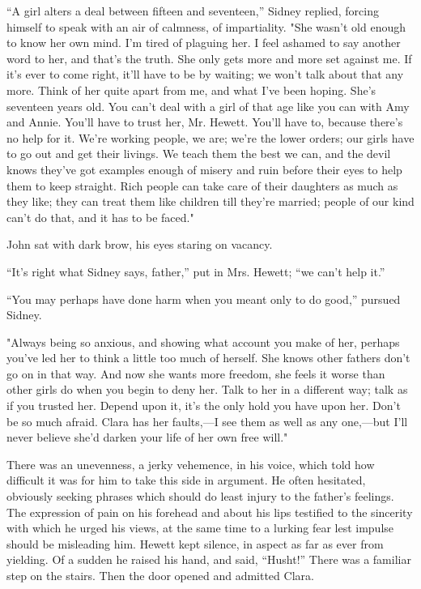 ``A girl alters a deal between fifteen and seventeen,'' Sidney replied,
forcing himself to speak with an air of calmness, of impartiality. "She
wasn't old enough to know her own mind. I'm tired of plaguing her. I
feel ashamed to say another word to her, and that's the truth. She only
gets more and more set against me. If it's ever to come right, it'll
have to be by waiting; we won't talk about that any more. Think of her
quite apart from me, and what I've been hoping. She's seventeen years
old. You can't deal with a girl of that age like you can with Amy and
Annie. You'll have to trust her, Mr. Hewett. You'll have to, because
there's no help for it. We're working people, we are; we're the lower
orders; our {}girls have to go out and get their livings. We teach them
the best we can, and the devil knows they've got examples enough of
misery and ruin before their eyes to help them to keep straight. Rich
people can take care of their daughters as much as they like; they can
treat them like children till they're married; people of our kind can't
do that, and it has to be faced."

John sat with dark brow, his eyes staring on vacancy.

``It's right what Sidney says, father,'' put in Mrs. Hewett; ``we can't
help it.''

``You may perhaps have done harm when you meant only to do good,''
pursued Sidney.

"Always being so anxious, and showing what account you make of her,
perhaps you've led her to think a little too much of herself. She knows
other fathers don't go on in that way. And now she wants more freedom,
she feels it worse than other girls do when you begin to deny her. Talk
to her in a different way; talk as if you trusted her. Depend upon it,
it's the only hold you have upon her. Don't {}be so much afraid. Clara
has her faults,---I see them as well as any one,---but I'll never
believe she'd darken your life of her own free will."

There was an unevenness, a jerky vehemence, in his voice, which told how
difficult it was for him to take this side in argument. He often
hesitated, obviously seeking phrases which should do least injury to the
father's feelings. The expression of pain on his forehead and about his
lips testified to the sincerity with which he urged his views, at the
same time to a lurking fear lest impulse should be misleading him.
Hewett kept silence, in aspect as far as ever from yielding. Of a sudden
he raised his hand, and said, ``Husht!'' There was a familiar step on
the stairs. Then the door opened and admitted Clara.

